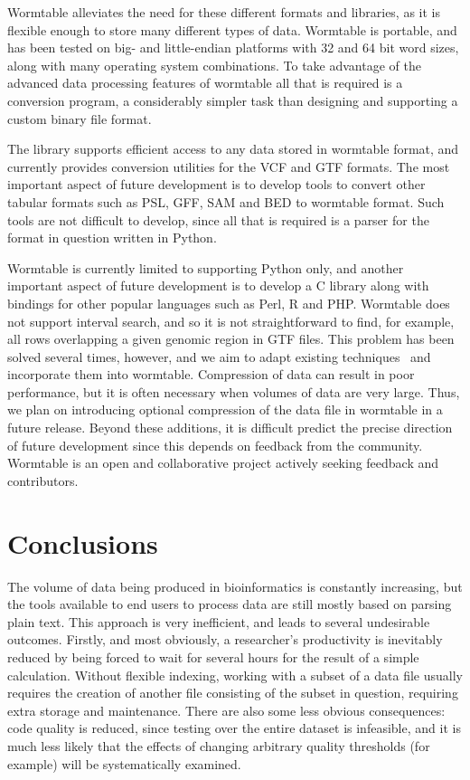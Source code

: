 \documentclass[10pt]{bmc_article}
\newenvironment{bmcformat}{\begin{raggedright}\baselineskip20pt\sloppy\setboolean{publ}{false}}{\end{raggedright}\baselineskip20pt\sloppy}
\begin{document}
\begin{bmcformat}
Wormtable alleviates the need for these different formats and libraries,
as it is flexible enough to store many different types of data. 
Wormtable is portable,
and has been tested on big- and little-endian platforms with 32 and 64
bit word sizes, along with many operating system combinations. To 
take advantage of the advanced data processing features of wormtable
all that is required is a conversion program, a considerably simpler
task than designing and supporting a custom binary file format.

The library supports efficient access to any data stored in 
wormtable format, and currently provides conversion utilities 
for the VCF and GTF formats.
The most important aspect of future development 
is to develop tools to convert other tabular formats such as 
PSL, GFF, SAM and BED to wormtable format. 
Such tools are not difficult to develop, since all that is required is a parser
for the format in question written in Python.

Wormtable is currently limited to supporting Python only, and 
another important aspect of future development is to 
develop a C library along with bindings for other popular
languages such as Perl, R and PHP. 
Wormtable does not support interval search, and so it is not
straightforward to find, for example, all rows overlapping 
a given genomic region in GTF files. 
This problem has been 
solved several times, however, and we aim to adapt existing 
techniques~\cite{li11,kzbhk10} and incorporate them into 
wormtable.  Compression of data can
result in poor performance, but it is often necessary when 
volumes of data are very large. Thus, we plan on introducing 
optional compression of the data file in wormtable in 
a future release. Beyond these additions, it is difficult
predict the precise direction of future development since this depends 
on feedback from the community.  Wormtable is an open and 
collaborative project actively seeking feedback and 
contributors.


\section*{Conclusions}
%
The volume of data being produced in bioinformatics is constantly 
increasing, but the tools available to end users to 
process data are still mostly based on parsing plain text. This 
approach is very inefficient, and leads to several undesirable outcomes.
Firstly, and most obviously, a researcher's productivity is inevitably
reduced by being forced to wait for several hours for the result of a 
simple calculation. Without flexible indexing, working with 
a subset of a data file usually requires the creation of 
another file consisting of the subset in question, requiring 
extra storage and maintenance.
There are also some less obvious consequences:
code quality is reduced, since testing over the entire dataset is 
infeasible, and it is much less likely that the effects of 
changing arbitrary quality thresholds (for example) will be 
systematically examined.


\end{bmcformat}
\end{document}
